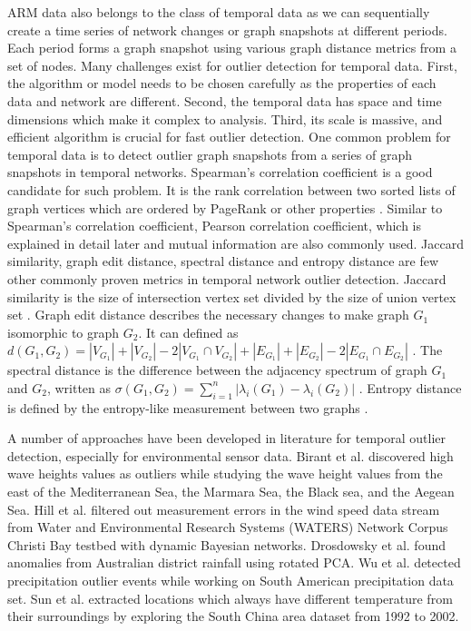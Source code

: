 ARM data also belongs to the class of temporal data as we can sequentially create a
time series of network changes or graph snapshots at different periods.
Each period forms a graph snapshot using various graph distance metrics
from a set of nodes. Many challenges exist for outlier detection for
temporal data. First, the algorithm or model needs to be chosen
carefully as the properties of each data and network are different.
Second, the temporal data has space and time dimensions which make it
complex to analysis. Third, its scale is massive, and efficient algorithm
is crucial for fast outlier detection. One common problem for temporal
data is to detect outlier graph snapshots from a series of graph snapshots
in temporal networks. Spearman's correlation coefficient is a good
candidate for such problem. It is the rank correlation between two
sorted lists of graph vertices which are ordered by PageRank or other
properties \cite{papadimitriou2010web}. Similar to Spearman's
correlation coefficient, Pearson correlation coefficient, which is explained 
in detail later and mutual information are also commonly used. 
Jaccard similarity, graph edit distance, spectral distance and entropy 
distance are few other commonly proven metrics in temporal network outlier detection.
Jaccard similarity is the size of intersection vertex set
divided by the size of union vertex set \cite{jay2012systematic}. Graph
edit distance describes the necessary changes to make graph $G_1$
isomorphic to graph $G_2$. It can defined as $d(G_1, G_2) = |V_{G_1}| +
|V_{G_2}| - 2|V_{G_1} \cap V_{G_2}| + |E_{G_1}| + |E_{G_2}| - 2|E_{G_1}
\cap E_{G_2}|$ \cite{papadimitriou2010web}. The spectral distance is the
difference between the adjacency spectrum of graph $G_1$ and $G_2$,
written as $\sigma(G_1, G_2) =
\displaystyle\sum_{i=1}^{n}|\lambda_i(G_1) - \lambda_i(G_2)|$
\cite{jovanovic2012spectral}. Entropy distance is defined by
the entropy-like measurement between two graphs
\cite{pincombe2005anomaly}.

A number of approaches have been developed in literature for temporal outlier detection,
especially for environmental sensor data. Birant et al.
\cite{kut2006spatio} discovered high wave heights values as outliers 
while studying the wave height values from the east of
the Mediterranean Sea, the Marmara Sea, the Black sea, and the
Aegean Sea. Hill et al. \cite{hill2007real, hill2010anomaly}
filtered out measurement errors in the wind speed data stream from
Water and Environmental Research Systems (WATERS) Network Corpus
Christi Bay testbed with dynamic Bayesian networks. Drosdowsky et
al. \cite{drosdowsky1993analysis} found anomalies from Australian
district rainfall using rotated PCA. Wu et al. \cite{wu2010spatio}
detected precipitation outlier events while working on South
American precipitation data set. Sun et al.
\cite{yuxiang2005detecting} extracted locations which always have
different temperature from their surroundings by exploring the
South China area dataset from 1992 to 2002.


